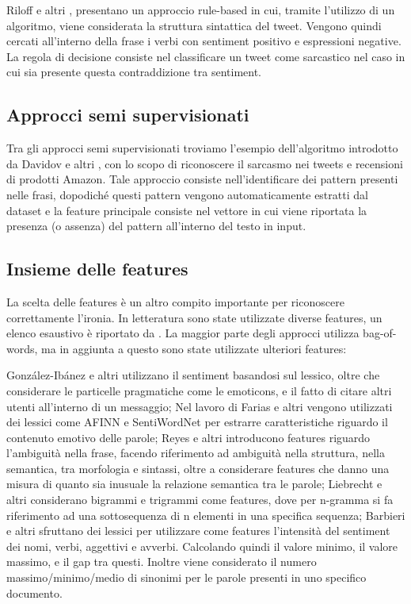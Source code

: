 \documentclass[oneside]{book}
\begin{document}
Riloff e altri \cite{rilof}, presentano un approccio rule-based in cui, tramite l'utilizzo di un algoritmo, viene considerata la struttura sintattica del tweet. Vengono quindi cercati all'interno della frase i verbi con sentiment positivo e espressioni negative. La regola di decisione consiste nel classificare un tweet come sarcastico nel caso in cui sia presente questa contraddizione tra sentiment.

\subsection{Approcci semi supervisionati}
Tra gli approcci semi supervisionati troviamo l'esempio dell'algoritmo introdotto da Davidov e altri \cite{davidov}, con lo scopo di  riconoscere il sarcasmo nei tweets e recensioni di prodotti Amazon. Tale approccio consiste nell'identificare dei pattern presenti nelle frasi, dopodiché questi pattern vengono automaticamente estratti dal dataset e la feature principale consiste nel vettore in cui viene riportata la presenza (o assenza) del pattern all'interno del testo in input.

\subsection{Insieme delle features}
La scelta delle features è un altro compito importante per riconoscere correttamente l'ironia.
In letteratura sono state utilizzate diverse features, un elenco esaustivo è riportato da \cite{survey5}. La maggior parte degli approcci utilizza bag-of-words, ma in aggiunta a questo sono state utilizzate ulteriori features:

González-Ibánez e altri \cite{gonzalez} utilizzano il sentiment basandosi sul lessico, oltre che considerare le particelle pragmatiche come le emoticons, e il fatto di citare altri utenti all'interno di un messaggio;
Nel lavoro di Farias e altri \cite{farias} vengono utilizzati dei lessici come AFINN e SentiWordNet per estrarre caratteristiche riguardo il contenuto emotivo delle parole;
Reyes e altri \cite{reyes} introducono features riguardo l'ambiguità nella frase, facendo riferimento ad ambiguità nella struttura, nella semantica, tra morfologia e sintassi, oltre a considerare features che danno una misura di quanto sia inusuale la relazione semantica tra le parole; Liebrecht e altri \cite{gram} considerano bigrammi e trigrammi come features, dove per n-gramma si fa riferimento ad una sottosequenza di n elementi in una specifica sequenza;
Barbieri e altri \cite{sarcasm-ita} sfruttano dei lessici per utilizzare come features l'intensità del sentiment dei nomi, verbi, aggettivi e avverbi. Calcolando quindi il valore minimo, il valore massimo, e il gap tra questi. Inoltre viene considerato il numero massimo/minimo/medio di sinonimi per le parole presenti in uno specifico documento.
\end{document}
